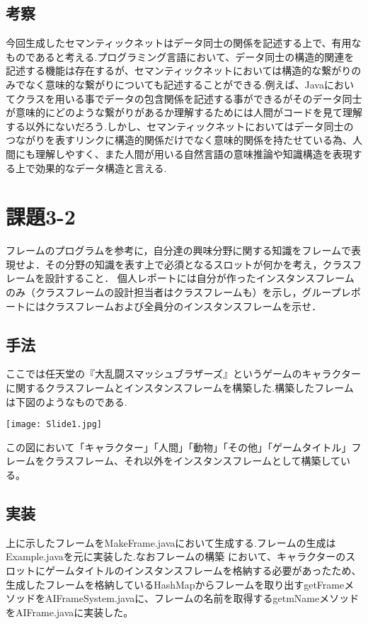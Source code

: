 \documentclass[a4j]{jarticle}
\begin{document}
\subsection{考察}
今回生成したセマンティックネットはデータ同士の関係を記述する上で、有用なものであると考える.プログラミング言語において、データ同士の構造的関連を記述する機能は存在するが、セマンティックネットにおいては構造的な繋がりのみでなく意味的な繋がりについても記述することができる.例えば、Javaにおいてクラスを用いる事でデータの包含関係を記述する事ができるがそのデータ同士が意味的にどのような繋がりがあるか理解するためには人間がコードを見て理解する以外にないだろう.しかし、セマンティックネットにおいてはデータ同士のつながりを表すリンクに構造的関係だけでなく意味的関係を持たせている為、人間にも理解しやすく、また人間が用いる自然言語の意味推論や知識構造を表現する上で効果的なデータ構造と言える.


\section{課題3-2}
\begin{screen}
フレームのプログラムを参考に，自分達の興味分野に関する知識をフレームで表現せよ．その分野の知識を表す上で必須となるスロットが何かを考え，クラスフレームを設計すること．
個人レポートには自分が作ったインスタンスフレームのみ（クラスフレームの設計担当者はクラスフレームも）を示し，グループレポートにはクラスフレームおよび全員分のインスタンスフレームを示せ．
\end{screen}

\subsection{手法}
ここでは任天堂の『大乱闘スマッシュブラザーズ』というゲームのキャラクターに関するクラスフレームとインスタンスフレームを構築した.構築したフレームは下図のようなものである.


\texttt{[image: Slide1.jpg]}

この図において「キャラクター」「人間」「動物」「その他」「ゲームタイトル」フレームをクラスフレーム、それ以外をインスタンスフレームとして構築している。


\subsection{実装}
上に示したフレームをMakeFrame.javaにおいて生成する.フレームの生成はExample.javaを元に実装した.なおフレームの構築
において、キャラクターのスロットにゲームタイトルのインスタンスフレームを格納する必要があったため、生成したフレームを格納しているHashMapからフレームを取り出すgetFrameメソッドをAIFrameSystem.javaに、フレームの名前を取得するgetmNameメソッドをAIFrame.javaに実装した。
\end{document}
